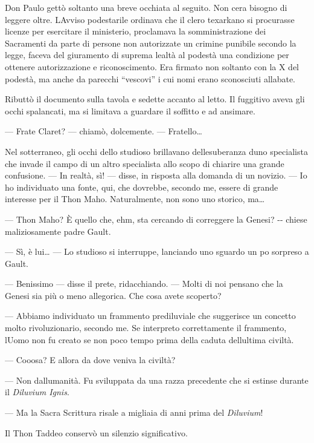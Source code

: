 Don Paulo gettò soltanto una breve occhiata al seguito. Non
c\textquotesingle era bisogno di leggere oltre. L\textquotesingle Avviso
podestarile ordinava che il clero texarkano si procurasse licenze per
esercitare il ministerio, proclamava la somministrazione dei Sacramenti
da parte di persone non autorizzate un crimine punibile secondo la
legge, faceva del giuramento di suprema lealtà al podestà una condizione
per ottenere autorizzazione e riconoscimento. Era firmato non soltanto
con la X del podestà, ma anche da parecchi ``vescovi'' i cui nomi erano
sconosciuti all\textquotesingle abate.

Ributtò il documento sulla tavola e sedette accanto al letto. Il
fuggitivo aveva gli occhi spalancati, ma si limitava a guardare il
soffitto e ad ansimare.

--- Frate Claret? --- chiamò, dolcemente. --- Fratello\ldots{}

Nel sotterraneo, gli occhi dello studioso brillavano
dell\textquotesingle esuberanza d\textquotesingle uno specialista che
invade il campo di un altro specialista allo scopo di chiarire una
grande confusione. --- In realtà, sì! --- disse, in risposta alla
domanda di un novizio. --- Io ho individuato una fonte, qui, che
dovrebbe, secondo me, essere di grande interesse per il Thon Maho.
Naturalmente, non sono uno storico, ma\ldots{}

--- Thon Maho? È quello che, ehm, sta cercando di correggere la Genesi?
-\/- chiese maliziosamente padre Gault.

--- Sì, è lui\ldots{} --- Lo studioso si interruppe, lanciando uno
sguardo un po\textquotesingle{} sorpreso a Gault.

--- Benissimo --- disse il prete, ridacchiando. --- Molti di noi pensano
che la Genesi sia più o meno allegorica. Che cosa avete scoperto?

--- Abbiamo individuato un frammento prediluviale che suggerisce un
concetto molto rivoluzionario, secondo me. Se interpreto correttamente
il frammento, l\textquotesingle Uomo non fu creato se non poco tempo
prima della caduta dell\textquotesingle ultima civiltà.

--- Cooosa? E allora da dove veniva la civiltà?

--- Non dall\textquotesingle umanità. Fu sviluppata da una razza
precedente che si estinse durante il \emph{Diluvium Ignis}.

--- Ma la Sacra Scrittura risale a migliaia di anni prima del
\emph{Diluvium}!

Il Thon Taddeo conservò un silenzio significativo.

